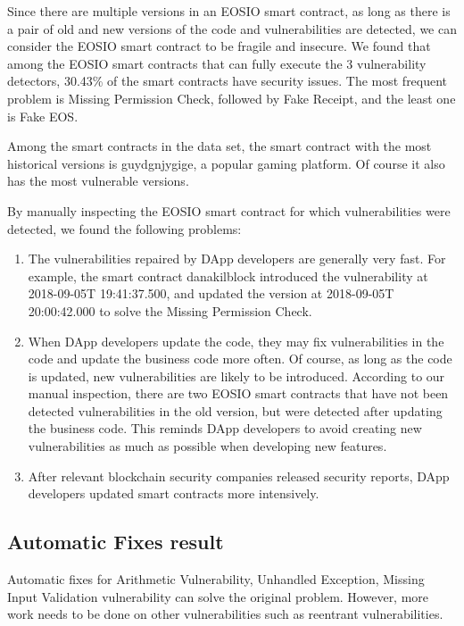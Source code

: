 \documentclass[a4paper, 10pt, conference, twocolumn]{ieeeconf}       %
\begin{document}
Since there are multiple versions in an EOSIO smart contract,
as long as there is a pair of old and new versions of the code and vulnerabilities are detected,
we can consider the EOSIO smart contract to be fragile and insecure.
We found that among the EOSIO smart contracts that can fully execute the 3 vulnerability detectors,
30.43\% of the smart contracts have security issues.
The most frequent problem is Missing Permission Check,
followed by Fake Receipt,
and the least one is Fake EOS.

Among the smart contracts in the data set,
the smart contract with the most historical versions is guydgnjygige,
a popular gaming platform.
Of course it also has the most vulnerable versions.

By manually inspecting the EOSIO smart contract for which vulnerabilities were detected,
we found the following problems:
\begin{enumerate}
    \item The vulnerabilities repaired by DApp developers are generally very fast. For example, the smart contract danakilblock introduced the vulnerability at 2018-09-05T 19:41:37.500, and updated the version at 2018-09-05T 20:00:42.000 to solve the Missing Permission Check.
    \item When DApp developers update the code, they may fix vulnerabilities in the code and update the business code more often. Of course, as long as the code is updated, new vulnerabilities are likely to be introduced. According to our manual inspection, there are two EOSIO smart contracts that have not been detected vulnerabilities in the old version, but were detected after updating the business code. This reminds DApp developers to avoid creating new vulnerabilities as much as possible when developing new features.
    \item After relevant blockchain security companies released security reports, DApp developers updated smart contracts more intensively.
\end{enumerate}

\subsection{Automatic Fixes result}

Automatic fixes for Arithmetic Vulnerability, Unhandled Exception, Missing Input Validation vulnerability can solve the original problem.
However, more work needs to be done on other vulnerabilities such as reentrant vulnerabilities.
\end{document}
